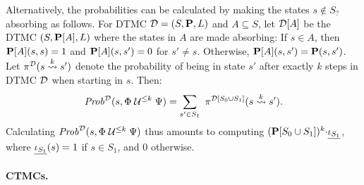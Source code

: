\documentclass{llncs}
\begin{document}
	Alternatively, the probabilities can be calculated
        by making the states $s \not\in S_?$ absorbing as follows.
        For DTMC $\mathcal{D} = (S,\mathbf{P},L)$ and $A \subseteq S$,
        let $\mathcal{D}[A]$ be the DTMC $(S,\mathbf{P}[A],L)$
        where the states in $A$ are made absorbing:
        If $s \in A$, then $\mathbf{P}[A](s,s) = 1$
        and $\mathbf{P}[A](s,s') = 0$ for $s' \neq s$.
        Otherwise, $\mathbf{P}[A](s,s') = \mathbf{P}(s,s')$.
        Let $\pi^{\mathcal{D}}(s \overset{k}{\rightsquigarrow} s')$
        denote the probability of being in state $s'$ after exactly $k$ steps in DTMC $\mathcal{D}$
        when starting in $s$.
        Then:
        \begin{equation*}\label{A}
                \mathit{Prob}^{\mathcal{D}}(s,\Phi \mathrel{\mathcal{U}^{\leq k}} \Psi) =
                \sum_{s' \in S_1} \ \pi^{\mathcal{D}[S_0 \cup S_1]}(s \overset{k}{\rightsquigarrow} s') .
        \end{equation*}
        Calculating $\mathit{Prob}^{\mathcal{D}}(s,\Phi \mathrel{\mathcal{U}^{\leq k}} \Psi)$
        thus amounts to computing $(\mathbf{P}[S_0 \cup S_1])^k{\cdot}\underline{\iota_{S_1}}$,
        where $\underline{\iota_{S_1}}(s) = 1$ if $s \in S_1$, and 0 otherwise.

\paragraph{CTMCs.}
\end{document}
